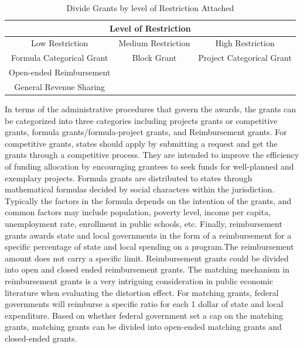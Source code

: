 \begin{table}[H]
    \centering
    \caption{Divide Grants by level of Restriction Attached}
    \begin{tabular}{ccc}
        \toprule
        \multicolumn{3}{c}{Level of Restriction}                                   \\
        \midrule
        Low Restriction           & Medium Restriction & High Restriction          \\
        \midrule
        Formula Categorical Grant & Block Grant        & Project Categorical Grant \\
        Open-ended Reimbursement  &                    &                           \\
        General Revenue Sharing   &                    &                           \\
        \bottomrule
    \end{tabular}%
    \label{Table 1.1}%
\end{table}%



In terms of the administrative procedures that govern the awards, the grants can be categorized into three categories including projects grants or competitive grants, formula grants/formula-project grants, and Reimbursement grants. For competitive grants, states should apply by submitting a request and get the grants through a competitive process. They are intended to improve the efficiency of funding allocation by encouraging grantees to seek funds for well-planned and exemplary projects. Formula grants are distributed to states through mathematical formulas decided by social characters within the jurisdiction. Typically the factors in the formula depends on the intention of the grants, and common factors may include population, poverty level, income per capita, unemployment rate, enrollment in public schools, etc. Finally, reimbursement grants awards state and local governments in the form of a reimbursement for a specific percentage of state and local spending on a program.The reimbursement amount does not carry a specific limit. Reimbursement grants could be divided into open and closed ended reimbursement grants. The matching mechanism in reimbursement grants is a very intriguing consideration in public economic literature when evaluating the distortion effect. For matching grants, federal governments will reimburse a specific ratio for each 1 dollar of state and local expenditure. Based on whether federal government set a cap on the matching grants, matching grants can be divided into open-ended matching grants and closed-ended grants.



